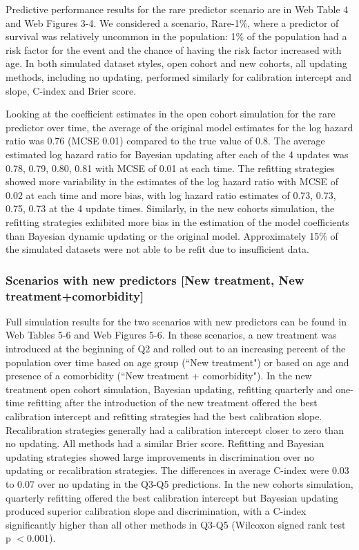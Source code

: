 \documentclass[]{article}
\begin{document}
Predictive performance results for the rare predictor scenario are in Web Table 4 and Web Figures 3-4. We considered a scenario, Rare-1\%, where a predictor of survival was relatively uncommon in the population: 1\% of the population had a risk factor for the event and the chance of having the risk factor increased with age. In both simulated dataset styles, open cohort and new cohorts, all updating methods, including no updating, performed similarly for calibration intercept and slope, C-index and Brier score.  

Looking at the coefficient estimates in the open cohort simulation for the rare predictor over time, the average of the original model estimates for the log hazard ratio was 0.76 (MCSE 0.01) compared to the true value of 0.8. The average estimated log hazard ratio for Bayesian updating after each of the 4 updates was 0.78, 0.79, 0.80, 0.81 with MCSE of 0.01 at each time. The refitting strategies showed more variability in the estimates of the log hazard ratio with MCSE of 0.02 at each time and more bias, with log hazard ratio estimates of 0.73, 0.73, 0.75, 0.73 at the 4 update times.  Similarly, in the new cohorts simulation, the refitting strategies exhibited more bias in the estimation of the model coefficients than Bayesian dynamic updating or the original model. Approximately 15\% of the simulated datasets were not able to be refit due to insufficient data. 



\subsubsection{Scenarios with new predictors [New treatment, New treatment+comorbidity]}

Full simulation results for the two scenarios with new predictors can be found in Web Tables 5-6 and Web Figures 5-6. In these scenarios, a new treatment was introduced at the beginning of Q2 and rolled out to an increasing percent of the population over time based on age group (``New treatment") or based on age and presence of a comorbidity (``New treatment + comorbidity"). In the new treatment open cohort simulation, Bayesian updating, refitting quarterly and one-time refitting after the introduction of the new treatment offered the best calibration intercept and refitting strategies had the best calibration slope. Recalibration strategies generally had a calibration intercept closer to zero than no updating. All methods had a similar Brier score. Refitting and Bayesian updating strategies showed large improvements in discrimination over no updating or recalibration strategies. The differences in average C-index were 0.03 to 0.07 over no updating in the Q3-Q5 predictions. In the new cohorts simulation, quarterly refitting offered the best calibration intercept but Bayesian updating produced superior calibration slope and discrimination, with a C-index significantly higher than all other methods in Q3-Q5 (Wilcoxon signed rank test p $<$0.001).  
\end{document}
